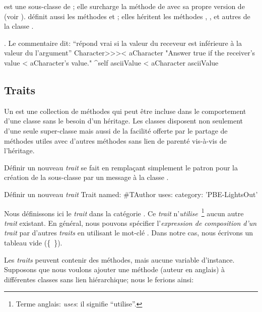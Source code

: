 \documentclass[a4paper,10pt,twoside]{book}
\begin{document}
 est une sous-classe de ; elle surcharge la méthode  de \ct{<} avec sa propre version de \ct{<} (voir ).   définit aussi les méthodes \ct{=} et ; elles héritent les méthodes \ct{>=}, \ct{<=}, \ct{~=} et autres de la classe .

\begin{method}[CharacterLessThan]{. Le commentaire dit: ``répond vrai si la valeur du receveur est inférieure à la valeur du l'argument''}
Character>>>< aCharacter 
	"Answer true if the receiver's value < aCharacter's value."
	^self asciiValue < aCharacter asciiValue
\end{method}

\subsection{Traits}
Un  est une collection de méthodes qui peut être incluse dans le comportement d'une classe sans le besoin d'un héritage.
Les classes disposent non seulement d'une seule super-classe mais aussi de la facilité offerte par le partage de méthodes utiles avec d'autres méthodes sans lien de parenté vis-à-vis de l'héritage.

Définir un nouveau \emph{trait} se fait en remplaçant simplement le patron
pour la création de la sous-classe par un message à la classe .

\begin{classdef}[tauthor]{Définir un nouveau \emph{trait}}
Trait named: #TAuthor
	uses: { }
	category: 'PBE-LightsOut'
\end{classdef}

\noindent
Nous définissons ici le \emph{trait}  dans la catégorie .
Ce \emph{trait} n'\emph{utilise}~\footnote{Terme anglais: \emph{uses}: il signifie ``utilise''.} aucun autre \emph{trait} existant.
En général, nous pouvons spécifier l'\emph{expression de composition d'un trait} par d'autres \emph{traits} en u\-ti\-li\-sant le mot-clé .
Dans notre cas, nous écrivons un tableau vide \mbox{(\{ \}).}

Les \emph{traits} peuvent contenir des méthodes, mais aucune variable d'instance.
Supposons que nous voulons ajouter une méthode  (auteur en anglais) à différentes classes sans lien hiérarchique;
nous le ferions ainsi:
\end{document}
